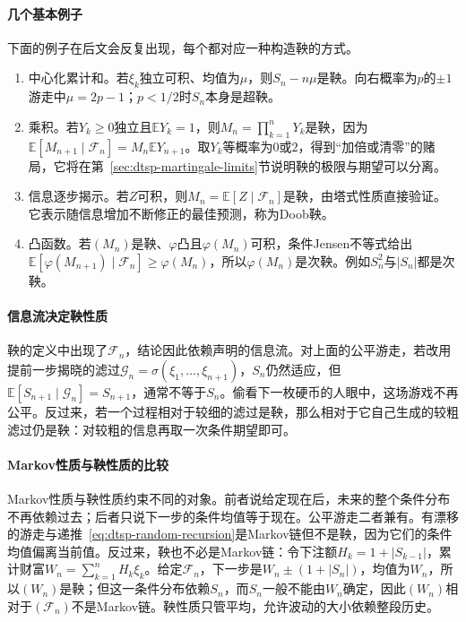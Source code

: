 \paragraph{几个基本例子}
下面的例子在后文会反复出现，每个都对应一种构造鞅的方式。
\begin{enumerate}
  \item 中心化累计和。若$\xi_k$独立可积、均值为$\mu$，则$S_n-n\mu$是鞅。向右概率为$p$的$\pm1$游走中$\mu=2p-1$；$p<1/2$时$S_n$本身是超鞅。
  \item 乘积。若$Y_k\geq0$独立且$\mathbb EY_k=1$，则$M_n=\prod_{k=1}^nY_k$是鞅，因为$\mathbb E[M_{n+1}\mid\mathcal F_n]=M_n\mathbb EY_{n+1}$。取$Y_k$等概率为$0$或$2$，得到“加倍或清零”的赌局，它将在第~\ref{sec:dtsp-martingale-limits}节说明鞅的极限与期望可以分离。
  \item 信息逐步揭示。若$Z$可积，则$M_n=\mathbb E[Z\mid\mathcal F_n]$是鞅，由塔式性质直接验证。它表示随信息增加不断修正的最佳预测，称为Doob鞅。
  \item 凸函数。若$(M_n)$是鞅、$\varphi$凸且$\varphi(M_n)$可积，条件Jensen不等式给出$\mathbb E[\varphi(M_{n+1})\mid\mathcal F_n]\geq\varphi(M_n)$，所以$\varphi(M_n)$是次鞅。例如$S_n^2$与$|S_n|$都是次鞅。
\end{enumerate}

\paragraph{信息流决定鞅性质}
鞅的定义中出现了$\mathcal F_n$，结论因此依赖声明的信息流。对上面的公平游走，若改用提前一步揭晓的滤过$\mathcal G_n=\sigma(\xi_1,\ldots,\xi_{n+1})$，$S_n$仍然适应，但$\mathbb E[S_{n+1}\mid\mathcal G_n]=S_{n+1}$，通常不等于$S_n$。偷看下一枚硬币的人眼中，这场游戏不再公平。反过来，若一个过程相对于较细的滤过是鞅，那么相对于它自己生成的较粗滤过仍是鞅：对较粗的信息再取一次条件期望即可。

\paragraph{Markov性质与鞅性质的比较}
Markov性质与鞅性质约束不同的对象。前者说给定现在后，未来的整个条件分布不再依赖过去；后者只说下一步的条件均值等于现在。公平游走二者兼有。有漂移的游走与递推~\eqref{eq:dtsp-random-recursion}是Markov链但不是鞅，因为它们的条件均值偏离当前值。反过来，鞅也不必是Markov链：令下注额$H_k=1+|S_{k-1}|$，累计财富$W_n=\sum_{k=1}^nH_k\xi_k$。给定$\mathcal F_n$，下一步是$W_n\pm(1+|S_n|)$，均值为$W_n$，所以$(W_n)$是鞅；但这一条件分布依赖$S_n$，而$S_n$一般不能由$W_n$确定，因此$(W_n)$相对于$(\mathcal F_n)$不是Markov链。鞅性质只管平均，允许波动的大小依赖整段历史。

